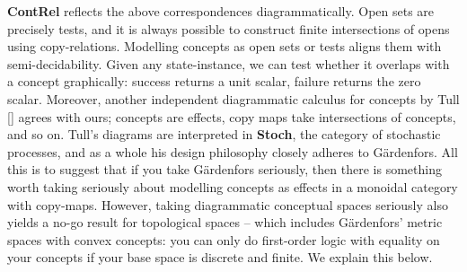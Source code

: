 \textbf{ContRel} reflects the above correspondences diagrammatically. Open sets are precisely tests, and it is always possible to construct finite intersections of opens using copy-relations. Modelling concepts as open sets or tests aligns them with semi-decidability. Given any state-instance, we can test whether it overlaps with a concept graphically: success returns a unit scalar, failure returns the zero scalar. Moreover, another independent diagrammatic calculus for concepts by Tull [] agrees with ours; concepts are effects, copy maps take intersections of concepts, and so on. Tull's diagrams are interpreted in \textbf{Stoch}, the category of stochastic processes, and as a whole his design philosophy closely adheres to G\"{a}rdenfors. All this is to suggest that if you take G\"{a}rdenfors seriously, then there is something worth taking seriously about modelling concepts as effects in a monoidal category with copy-maps. However, taking diagrammatic conceptual spaces seriously also yields a no-go result for topological spaces -- which includes G\"{a}rdenfors' metric spaces with convex concepts: you can only do first-order logic with equality on your concepts if your base space is discrete and finite. We explain this below.\\

